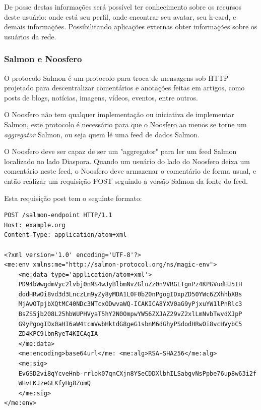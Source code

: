 \documentclass[12pt]{article}
\begin{document}
De posse destas informações será possível ter conhecimento sobre os recursos
deste usuário: onde está seu perfil, onde encontrar seu avatar, seu h-card, e
demais informações. Possibilitando aplicações externas obter informações sobre
os usuários da rede.

\subsubsection{Salmon e Noosfero}

O protocolo Salmon é um protocolo para troca de mensagens sob HTTP projetado
para descentralizar comentários e anotações feitas em artigos, como posts de
blogs, notícias, imagens, vídeos, eventos, entre outros.

O Noosfero não tem qualquer implementação ou iniciativa de implementar Salmon,
este protocolo é necessário para que o Noosfero ao menos se torne um {\it
aggregator} Salmon, ou seja quem lê uma feed de dados Salmon.

O Noosfero deve ser capaz de ser um "aggregator" para ler um feed Salmon
localizado no lado Diaspora. Quando um usuário do lado do Noosfero deixa um
comentário neste feed, o Noosfero deve armazenar o comentário de forma usual,
e então realizar um requisição POST\cite{salmon} seguindo a versão Salmon da
fonte do feed.

Esta requisição post tem o seguinte formato:

\begin{framed}
\begin{lstlisting}[caption=Exemplo requisição POST Salmon]
POST /salmon-endpoint HTTP/1.1
Host: example.org
Content-Type: application/atom+xml

<?xml version='1.0' encoding='UTF-8'?>
<me:env xmlns:me="http://salmon-protocol.org/ns/magic-env">
    <me:data type='application/atom+xml'>
    PD94bWwgdmVyc2lvbj0nMS4wJyBlbmNvZGluZz0nVVRGLTgnPz4KPGVudHJ5IH
    dodHRwOi8vd3d3LnczLm9yZy8yMDA1L0F0b20nPgogIDxpZD50YWc6ZXhhbXBs
    MjAwOTpjbXQtMC40NDc3NTcxODwvaWQ-ICAKICA8YXV0aG9yPjxuYW1lPnRlc3
    BsZS5jb208L25hbWUPHVyaT5hY2N0OmpwYW56ZXJAZ29vZ2xlLmNvbTwvdXJpP
    G9yPgogIDx0aHI6aW4tcmVwbHktdG8geG1sbnM6dGhyPSdodHRwOi8vcHVybC5
    ZD4KPC9lbnRyeT4KICAgIA
    </me:data>
    <me:encoding>base64url</me: <me:alg>RSA-SHA256</me:alg>
    <me:sig>
    EvGSD2vi8qYcveHnb-rrlok07qnCXjn8YSeCDDXlbhILSabgvNsPpbe76up8w63i2f
    WHvLKJzeGLKfyHg8ZomQ
    </me:sig>
</me:env>
\end{lstlisting}
\end{framed}
\end{document}
